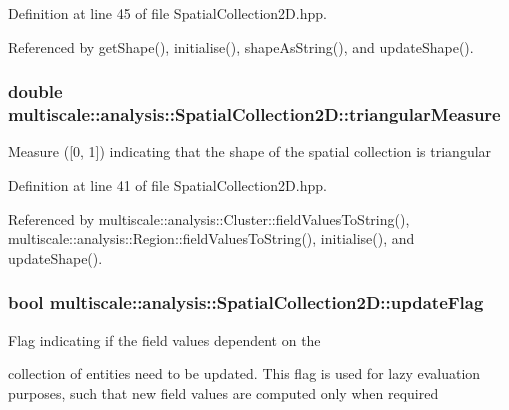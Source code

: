 Definition at line 45 of file Spatial\-Collection2\-D.\-hpp.



Referenced by get\-Shape(), initialise(), shape\-As\-String(), and update\-Shape().

\hypertarget{classmultiscale_1_1analysis_1_1SpatialCollection2D_a578070e91858e9e87de1e0f5771d6c3f}{
\subsubsection[{triangular\-Measure}]{\setlength{\rightskip}{0pt plus 5cm}double multiscale\-::analysis\-::\-Spatial\-Collection2\-D\-::triangular\-Measure\hspace{0.3cm}{\ttfamily [protected]}}}\label{classmultiscale_1_1analysis_1_1SpatialCollection2D_a578070e91858e9e87de1e0f5771d6c3f}
Measure (\mbox{[}0, 1\mbox{]}) indicating that the shape of the spatial collection is triangular 

Definition at line 41 of file Spatial\-Collection2\-D.\-hpp.



Referenced by multiscale\-::analysis\-::\-Cluster\-::field\-Values\-To\-String(), multiscale\-::analysis\-::\-Region\-::field\-Values\-To\-String(), initialise(), and update\-Shape().

\hypertarget{classmultiscale_1_1analysis_1_1SpatialCollection2D_a6d942f2856adc673e9d361596744b37f}{
\subsubsection[{update\-Flag}]{\setlength{\rightskip}{0pt plus 5cm}bool multiscale\-::analysis\-::\-Spatial\-Collection2\-D\-::update\-Flag\hspace{0.3cm}{\ttfamily [protected]}}}\label{classmultiscale_1_1analysis_1_1SpatialCollection2D_a6d942f2856adc673e9d361596744b37f}
\begin{DoxyVerb}                Flag indicating if the field values dependent on the
\end{DoxyVerb}
 collection of entities need to be updated. This flag is used for lazy evaluation purposes, such that new field values are computed only when required 

